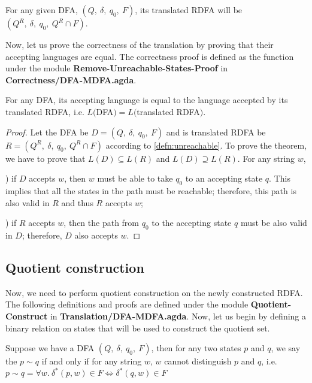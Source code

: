 \begin{defn}
\label{defn:unreachable}
\noindent For any given DFA, \((Q,\ \delta,\ q_0,\ F)\), its
translated RDFA will be \((Q^R,\ \delta,\ q_0,\ Q^R \cap F)\). 
\end{defn}

\par Now, let us prove the correctness of the translation by proving
that their accepting languages are equal. The correctness proof is
defined as the function  under the module
\textbf{Remove-Unreachable-States-Proof} in \textbf{Correctness/DFA-MDFA.agda}. 

\begin{thm}
\noindent For any DFA, its accepting language is equal to
the language accepted by its translated RDFA, i.e. \(L(\)DFA\()
= L(\)translated RDFA\()\). 
\end{thm}

\begin{proof}
\noindent Let the DFA be \(D = (Q,\ \delta,\ q_0,\ F)\) and is
translated RDFA be \(R = (Q^R,\ \delta,\ q_0,\ Q^R \cap F)\) according
to \autoref{defn:unreachable}. To prove the theorem, we have to prove
that \(L(D) \subseteq L(R)\) and \(L(D) \supseteq L(R)\). For any
string \(w\), 

\par {}) if \(D\) accepts \(w\), then \(w\) must be able to
take \(q_0\) to an accepting state \(q\). This implies that all the states in
the path must be reachable; therefore, this path is also valid in
\(R\) and thus \(R\) accepts \(w\); 

\par {}) if \(R\) accepts \(w\), then the path from \(q_0\)
to the accepting state \(q\) must be also valid in \(D\); therefore,
\(D\) also accepts \(w\). 
\end{proof}


\subsection{Quotient construction}
\par Now, we need to perform quotient construction on the newly
constructed RDFA. The following definitions and proofs are defined
under the module \textbf{Quotient-Construct} in
\textbf{Translation/DFA-MDFA.agda}. Now, let us begin by defining a
binary relation on states that will be used to construct the quotient set. 

\begin{defn}
\noindent Suppose we have a DFA \((Q,\ \delta,\ q_0,\ F)\), then for any two states \(p\) and \(q\), we say
the \(p \sim q\) if and only if for any string \(w\),
\(w\) cannot distinguish \(p\) and \(q\), i.e. \(p \sim q = \forall w.\
\delta^*(p,w) \in F \Leftrightarrow \delta^*(q,w) \in F\)
\end{defn}

